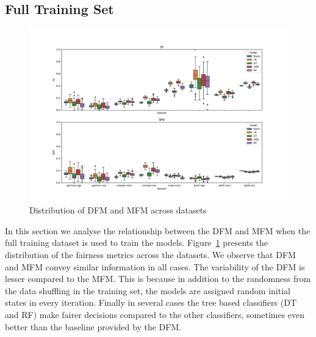\documentclass{article}
\begin{document}
\subsection{Full Training Set}\label{sec:results-full-data}

\begin{figure}
  \centering
  \includegraphics[width=0.95\linewidth]{boxplot--dataset--di-spd--exp-full.pdf}
  \caption{Distribution of DFM and MFM across datasets}
  \label{fig:boxplot--dataset--di-spd--exp-full}
\end{figure}

In this section we analyse the relationship between the DFM and MFM
when the full training dataset is used to train the models.
Figure \ref{fig:boxplot--dataset--di-spd--exp-full} presents the
distribution of the fairness metrics across the datasets. We observe
that DFM and MFM convey similar information in all cases. The
variability of the DFM is lesser compared to the MFM. This is because
in addition to the randomness from the data shuffling in the training
set, the models are assigned random initial states in every iteration.
Finally in several cases the tree based classifiers (DT and RF) make
fairer decisions compared to the other classifiers, sometimes even
better than the baseline provided by the DFM.


\end{document}
